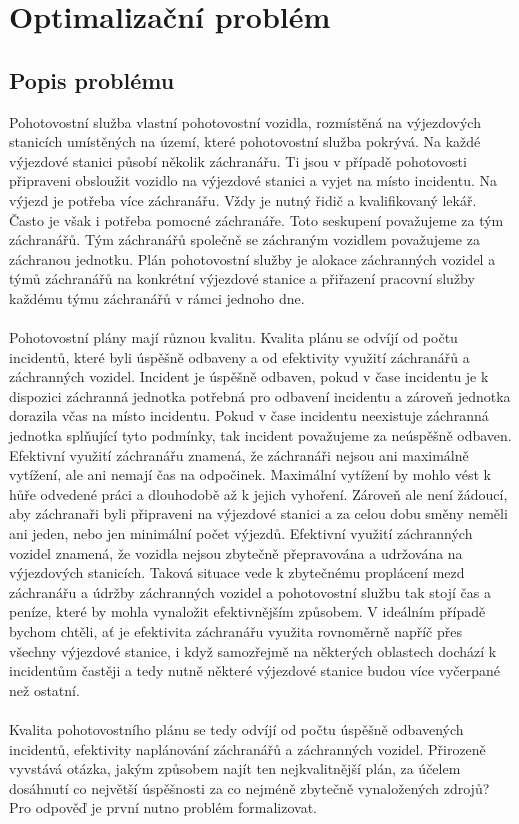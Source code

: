 \chapter{Optimalizační problém}

\section{Popis problému}

Pohotovostní služba vlastní pohotovostní vozidla, rozmístěná na výjezdových stanicích umístěných na území, které pohotovostní služba pokrývá.
Na každé výjezdové stanici působí několik záchranářu. Ti jsou v případě pohotovosti připraveni obsloužit vozidlo na výjezdové stanici a vyjet na místo incidentu.
Na výjezd je potřeba více záchranářu. Vždy je nutný řidič a kvalifikovaný lekář. Často je však i potřeba pomocné záchranáře.
Toto seskupení považujeme za tým záchranářů.
Tým záchranářů společně se záchraným vozidlem považujeme za záchranou jednotku.
Plán pohotovostní služby je alokace záchranných vozidel a týmů záchranářů na konkrétní výjezdové stanice a přiřazení pracovní služby každému týmu záchranářů v rámci jednoho dne.
\\\\
Pohotovostní plány mají různou kvalitu. Kvalita plánu se odvíjí od počtu incidentů, které byli úspěšně odbaveny a od efektivity využití záchranářů a záchranných vozidel.
Incident je úspěšně odbaven, pokud v čase incidentu je k dispozici záchranná jednotka potřebná pro odbavení incidentu a zároveň jednotka dorazila včas na místo incidentu.
Pokud v čase incidentu neexistuje záchranná jednotka splňující tyto podmínky, tak incident považujeme za neúspěšně odbaven.
Efektivní využití záchranářu znamená, že záchranáři nejsou ani maximálně vytížení, ale ani nemají čas na odpočinek.
Maximální vytížení by mohlo vést k hůře odvedené práci a dlouhodobě až k jejich vyhoření.
Zároveň ale není žádoucí, aby záchranaři byli připraveni na výjezdové stanici a za celou dobu směny neměli ani jeden, nebo jen minimální počet výjezdů.
Efektivní využití záchranných vozidel znamená, že vozidla nejsou zbytečně přepravována a udržována na výjezdových stanicích.
Taková situace vede k zbytečnému proplácení mezd záchranářu a údržby záchranných vozidel a pohotovostní službu tak stojí čas a peníze, které by mohla vynaložit efektivnějším způsobem.
V ideálním případě bychom chtěli, ať je efektivita záchranářu využita rovnoměrně napříč přes všechny výjezdové stanice, i když samozřejmě na některých oblastech dochází
k incidentům častěji a tedy nutně některé výjezdové stanice budou více vyčerpané než ostatní.
\\\\
Kvalita pohotovostního plánu se tedy odvíjí od počtu úspěšně odbavených incidentů, efektivity naplánování záchranářů a záchranných vozidel.
Přirozeně vyvstává otázka, jakým způsobem najít ten nejkvalitnější plán, za účelem dosáhnutí co největší úspěšnosti za co nejméně zbytečně vynaložených zdrojů? 
Pro odpověď je první nutno problém formalizovat.

